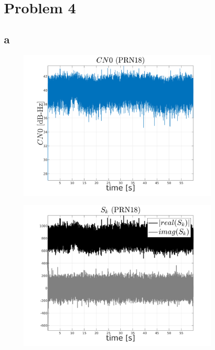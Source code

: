 \section{Problem 4}

\subsection{a}

\begin{figure}[H]
	\centering
	\includegraphics[width=0.9\textwidth]{fig/CN0_PRN18.png}
\end{figure}

\begin{figure}[H]
	\centering
	\includegraphics[width=0.9\textwidth]{fig/sk_PRN18.png}
\end{figure}

